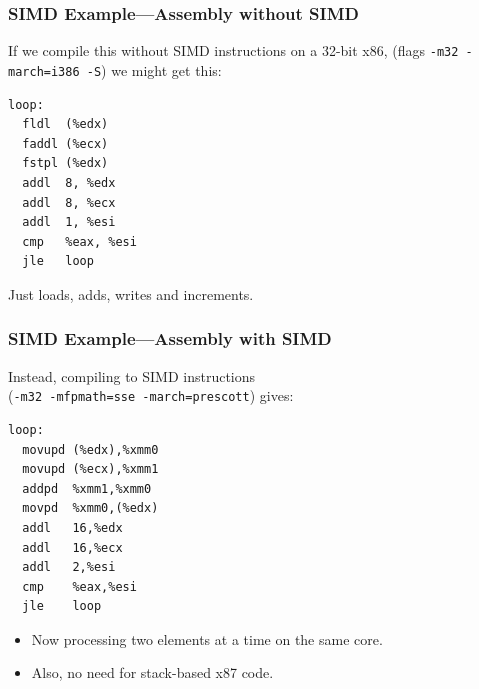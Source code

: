 \begin{frame}[fragile]
  \frametitle{SIMD Example---Assembly without SIMD}

  
If we compile this without SIMD instructions on a 32-bit x86, (flags {\tt -m32 -march=i386 -S}) we might get this:

  \begin{lstlisting}
loop:
  fldl  (%edx)
  faddl (%ecx)
  fstpl (%edx)
  addl  8, %edx
  addl  8, %ecx
  addl  1, %esi
  cmp   %eax, %esi
  jle   loop
  \end{lstlisting}

   Just loads, adds, writes and increments.
  
\end{frame}


\begin{frame}[fragile]
  \frametitle{SIMD Example---Assembly with SIMD}

  
 Instead, compiling to SIMD instructions\\ ({\tt -m32 -mfpmath=sse -march=prescott}) gives:

  \begin{lstlisting}
loop:
  movupd (%edx),%xmm0
  movupd (%ecx),%xmm1
  addpd  %xmm1,%xmm0
  movpd  %xmm0,(%edx)
  addl   16,%edx
  addl   16,%ecx
  addl   2,%esi
  cmp    %eax,%esi
  jle    loop
  \end{lstlisting}

  \begin{itemize}
    \item Now processing two elements at a time on the same core.
    \item Also, no need for stack-based x87 code.
  \end{itemize}
  
\end{frame}

